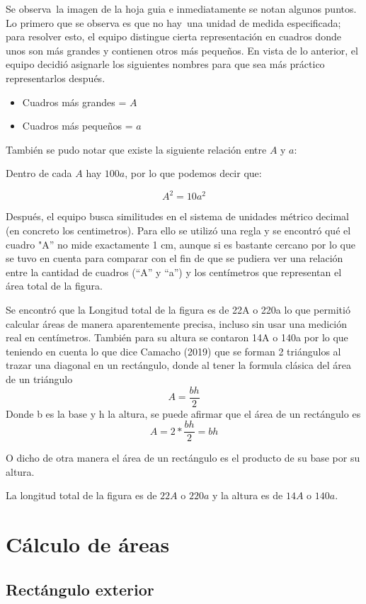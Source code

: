 \documentclass[12pt]{article}
\begin{document}
Se observa la imagen de la hoja guia e inmediatamente se notan algunos puntos. Lo primero que se observa es que no hay una unidad de medida especificada; para resolver esto, el equipo distingue cierta representación en cuadros donde unos son más grandes y contienen otros más pequeños. En vista de lo anterior, el equipo decidió asignarle los siguientes nombres para que sea más práctico representarlos después. 

\begin{itemize}
  \item Cuadros más grandes = $A$
  \item Cuadros más pequeños = $a$
\end{itemize}

También se pudo notar que existe la siguiente relación entre $A$ y $a$:

Dentro de cada $A$ hay $100a$, por lo que podemos decir que:

\[ A^2 = 10a^2 \]

Después, el equipo busca similitudes en el sistema de unidades métrico decimal (en concreto los centimetros). Para ello se utilizó una regla y se encontró qué el cuadro "A” no mide exactamente 1 cm, aunque si es bastante cercano por lo que se tuvo en cuenta para comparar con el fin de que se pudiera ver una relación entre la cantidad de cuadros (“A” y “a”) y los centímetros que representan el área total de la figura. 

Se encontró que la Longitud total de la figura es de 22A o 220a lo que permitió calcular áreas de manera aparentemente precisa, incluso sin usar una medición real en centímetros. También para su altura se contaron 14A o 140a por lo que teniendo en cuenta lo que dice Camacho (2019) que se forman 2 triángulos al trazar una diagonal en un rectángulo, donde al tener la formula clásica del área de un triángulo 
\[ A = {\frac{bh}{2}} \]
Donde b es la base y h la altura, se puede afirmar que el área de un rectángulo es 
\[A = {2*\frac{bh}{2}} = bh\]

O dicho de otra manera el área de un rectángulo es el producto de su base por su altura. 

La longitud total de la figura es de $22A$ o $220a$ y la altura es de $14A$ o $140a$.

\section{Cálculo de áreas}
\subsection{Rectángulo exterior}
\end{document}
